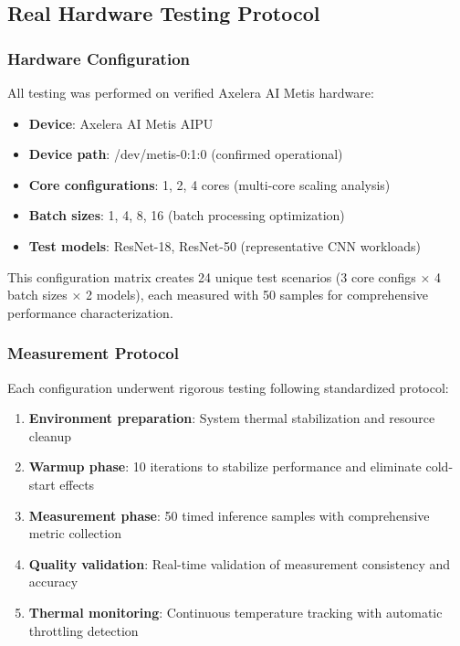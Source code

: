 \documentclass[manuscript]{acmart}
\begin{document}
\subsection{Real Hardware Testing Protocol}

\subsubsection{Hardware Configuration}
All testing was performed on verified Axelera AI Metis hardware:

\begin{itemize}
    \item \textbf{Device}: Axelera AI Metis AIPU
    \item \textbf{Device path}: /dev/metis-0:1:0 (confirmed operational)
    \item \textbf{Core configurations}: 1, 2, 4 cores (multi-core scaling analysis)
    \item \textbf{Batch sizes}: 1, 4, 8, 16 (batch processing optimization)
    \item \textbf{Test models}: ResNet-18, ResNet-50 (representative CNN workloads)
\end{itemize}

This configuration matrix creates 24 unique test scenarios (3 core configs × 4 batch sizes × 2 models), each measured with 50 samples for comprehensive performance characterization.

\subsubsection{Measurement Protocol}
Each configuration underwent rigorous testing following standardized protocol:

\begin{enumerate}
    \item \textbf{Environment preparation}: System thermal stabilization and resource cleanup
    \item \textbf{Warmup phase}: 10 iterations to stabilize performance and eliminate cold-start effects
    \item \textbf{Measurement phase}: 50 timed inference samples with comprehensive metric collection
    \item \textbf{Quality validation}: Real-time validation of measurement consistency and accuracy
    \item \textbf{Thermal monitoring}: Continuous temperature tracking with automatic throttling detection
\end{enumerate}
\end{document}
